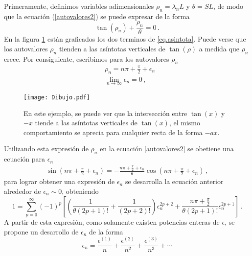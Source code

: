 Primeramente, definimos variables adimensionales $\rho _n = \lambda _n L $ y $\theta = S L $, de modo que la ecuación (\ref{autovalores2}) se puede expresar de la forma
\begin{equation}
    \tan (\rho _n) + \frac{\rho _n}{\theta} = 0
    \, .
    \label{eq.asintota}
\end{equation}
En la figura \ref{fig:Dibujo1} están graficados los dos terminos de \ref{eq.asintota}. Puede verse que los autovalores $\rho _n$ tienden a las asíntotas verticales de $ \tan ( \rho ) $ a medida que $\rho _n$ crece. Por consiguiente, escribimos para los autovalores $\rho _n$ 
\begin{align}
    & \rho _n = n \pi + \frac{\pi}{2} + \epsilon _n 
\label{eq.mu}    
\\[5pt]
\nonumber
    & \lim \limits_{ n \rightarrow \infty} \epsilon _n = 0
\, ,
\end{align}
\begin{figure}
    \centering
    \texttt{[image: Dibujo.pdf]}
    \caption{En este ejemplo, se puede ver que la intersección entre $ \tan(x)$ y $-x$ tiende a las asíntotas verticales de $\tan (x) $, el mismo comportamiento se aprecia para cualquier recta de la forma $- a x$.}
    \label{fig:Dibujo1}
\end{figure}
Utilizando esta expresión de $\rho _n$ en la ecuación \eqref{autovalores2} se obetiene una ecuación para $\epsilon _n$
\begin{equation}
\begin{aligned}
    \sin \left( n \pi + \frac{\pi}{2} + \epsilon _n \right) = -
    \frac{n \pi + \frac{\pi}{2} + \epsilon _n}{\theta} \cos \left( n \pi + \frac{\pi}{2} + \epsilon _n\right)
    \, ,
\end{aligned}
\end{equation}
para lograr obtener una expresión de $\epsilon _n$ se desarrolla la ecuación anterior alrededor de $\epsilon  _n \sim 0$, obteniendo 
\begin{equation}
    1 = 
    \sum _{p=0} ^{\infty} (-1) ^p     \left[
   	\left( \frac{1}{\theta (2p+1)!  } + \frac{1}{(2p+2)!} \right) \epsilon _n ^{2p+2 } +
  	\frac{n \pi + \frac{\pi}{2}}{\theta (2p+1)! }   \epsilon _n ^{2p+1} 			\right]
  	\, .
\label{igualdad epsilon}
\end{equation}
A partir de esta expresión, como solamente existen potencias enteras de $\epsilon$, se propone un desarrollo de  $\epsilon _n$ de la forma
\begin{equation}
\label{eq.epsilon}
    \epsilon _n = 
    \frac{\epsilon ^{(1)}}{n}  + 
    \frac{\epsilon ^{(2)}}{n ^2}  + 
    \frac{\epsilon ^{(3)}}{n ^3}  + \dotsb
\end{equation}
